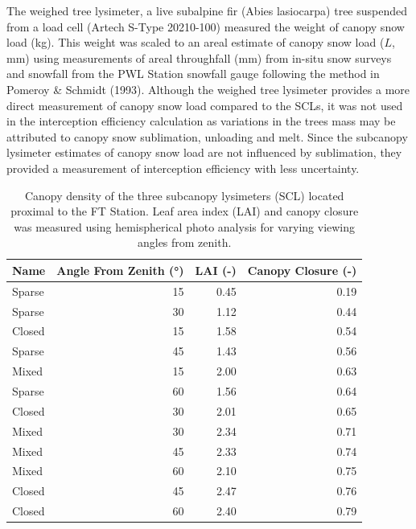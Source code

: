 \documentclass[
  letterpaper,
  DIV=11,
  numbers=noendperiod]{scrartcl}
\begin{document}
The weighed tree lysimeter, a live subalpine fir (Abies lasiocarpa) tree
suspended from a load cell (Artech S-Type 20210-100) measured the weight
of canopy snow load (kg). This weight was scaled to an areal estimate of
canopy snow load (\(L\), mm) using measurements of areal throughfall
(mm) from in-situ snow surveys and snowfall from the PWL Station
snowfall gauge following the method in Pomeroy \& Schmidt (1993).
Although the weighed tree lysimeter provides a more direct measurement
of canopy snow load compared to the SCLs, it was not used in the
interception efficiency calculation as variations in the trees mass may
be attributed to canopy snow sublimation, unloading and melt. Since the
subcanopy lysimeter estimates of canopy snow load are not influenced by
sublimation, they provided a measurement of interception efficiency with
less uncertainty.

\begin{longtable}[]{@{}lrrr@{}}

\caption{\label{tbl-scl-lai-cc}Canopy density of the three subcanopy
lysimeters (SCL) located proximal to the FT Station. Leaf area index
(LAI) and canopy closure was measured using hemispherical photo analysis
for varying viewing angles from zenith.}

\tabularnewline

\toprule\noalign{}
Name & Angle From Zenith (°) & LAI (-) & Canopy Closure (-) \\
\midrule\noalign{}
\endhead
\bottomrule\noalign{}
\endlastfoot
Sparse & 15 & 0.45 & 0.19 \\
Sparse & 30 & 1.12 & 0.44 \\
Closed & 15 & 1.58 & 0.54 \\
Sparse & 45 & 1.43 & 0.56 \\
Mixed & 15 & 2.00 & 0.63 \\
Sparse & 60 & 1.56 & 0.64 \\
Closed & 30 & 2.01 & 0.65 \\
Mixed & 30 & 2.34 & 0.71 \\
Mixed & 45 & 2.33 & 0.74 \\
Mixed & 60 & 2.10 & 0.75 \\
Closed & 45 & 2.47 & 0.76 \\
Closed & 60 & 2.40 & 0.79 \\

\end{longtable}
\end{document}
